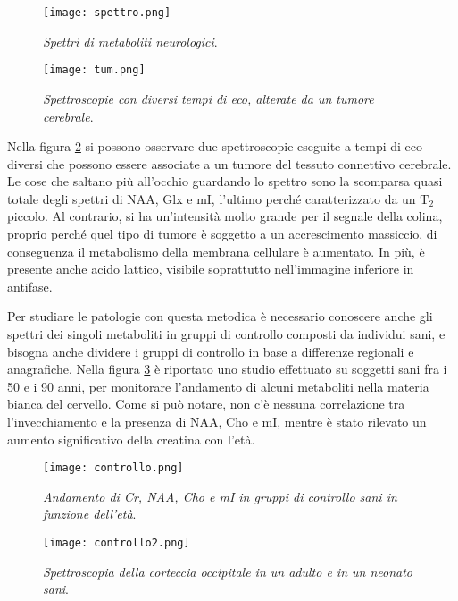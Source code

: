 \documentclass{report}
\newcommand{\figref}[1]{figura \ref{#1}}
\numberwithin{equation}{section}
\numberwithin{figure}{section}
\begin{document}
\begin{figure}[htp]
\centering
\texttt{[image: spettro.png]}
\caption{\label{fig:spettro} \textit{Spettri di metaboliti neurologici}.}
\end{figure}

\begin{figure}[htp]
\centering
\texttt{[image: tum.png]}
\caption{\label{fig:tum} \textit{Spettroscopie con diversi tempi di eco, alterate da un tumore cerebrale}.}
\end{figure}

Nella \figref{fig:tum} si possono osservare due spettroscopie eseguite a tempi di eco diversi che possono essere associate a un tumore del tessuto connettivo cerebrale. Le cose che saltano più all'occhio guardando lo spettro sono la scomparsa quasi totale degli spettri di NAA, Glx e mI, l'ultimo perché caratterizzato da un $\mathrm{T_2}$ piccolo. Al contrario, si ha un'intensità molto grande per il segnale della colina, proprio perché quel tipo di tumore è soggetto a un accrescimento massiccio, di conseguenza il metabolismo della membrana cellulare è aumentato. In più, è presente anche acido lattico, visibile soprattutto nell'immagine inferiore in antifase.

Per studiare le patologie con questa metodica è necessario conoscere anche gli spettri dei singoli metaboliti in gruppi di controllo composti da individui sani, e bisogna anche dividere i gruppi di controllo in base a differenze regionali e anagrafiche. Nella \figref{fig:controllo} è riportato uno studio effettuato su soggetti sani fra i 50 e i 90 anni, per monitorare l'andamento di alcuni metaboliti nella materia bianca del cervello. Come si può notare, non c'è nessuna correlazione tra l'invecchiamento e la presenza di NAA, Cho e mI, mentre è stato rilevato un aumento significativo della creatina con l'età.

\begin{figure}[htp]
\centering
\texttt{[image: controllo.png]}
\caption{\label{fig:controllo} \textit{Andamento di Cr, NAA, Cho e mI in gruppi di controllo sani in funzione dell'età}.}
\end{figure}

\begin{figure}[htp]
\centering
\texttt{[image: controllo2.png]}
\caption{\label{fig:controllo2} \textit{Spettroscopia della corteccia occipitale in un adulto e in un neonato sani}.}
\end{figure}
\end{document}
